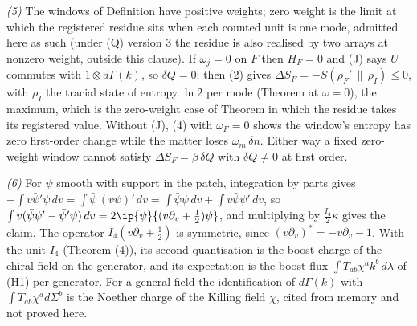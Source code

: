 \emph{(5)} The windows of Definition  have positive weights; zero weight is the limit at which the registered residue sits when each counted unit is one mode, admitted here as such (under (Q) version 3 the residue is also realised by two arrays at nonzero weight, outside this clause). If $\omega_{j} = 0$ on $F$ then $H_{F} = 0$ and (J) says $U$ commutes with $1\otimes d\Gamma(k)$, so $\delta Q = 0$; then (2) gives $\Delta S_{F} = -S(\rho_{F}'\,\|\,\rho_{I}) \le 0$, with $\rho_{I}$ the tracial state of entropy $\ln 2$ per mode (Theorem  at $\omega = 0$), the maximum, which is the zero-weight case of Theorem  in which the residue takes its registered value. Without (J), (4) with $\omega_{F} = 0$ shows the window's entropy has zero first-order change while the matter loses $\omega_{m}\,\delta n$. Either way a fixed zero-weight window cannot satisfy $\Delta S_{F} = \beta\,\delta Q$ with $\delta Q \ne 0$ at first order.

\emph{(6)} For $\psi$ smooth with support in the patch, integration by parts gives $-\int v\bar\psi'\psi\,dv = \int\bar\psi\,(v\psi)'\,dv = \int\bar\psi\psi\,dv + \int v\bar\psi\psi'\,dv$, so $\int v(\bar\psi\psi' - \bar\psi'\psi)\,dv = 2\ip{\psi}{(v\partial_{v} + \tfrac12)\psi}$, and multiplying by $\tfrac{I_{4}}{2}\kappa$ gives the claim. The operator $I_{4}(v\partial_{v} + \tfrac12)$ is symmetric, since $(v\partial_{v})^{*} = -v\partial_{v} - 1$. With the unit $I_{4}$ (Theorem (4)), its second quantisation is the boost charge of the chiral field on the generator, and its expectation is the boost flux $\int T_{ab}\chi^{a}k^{b}\,d\lambda$ of (H1) per generator. For a general field the identification of $d\Gamma(k)$ with $\int T_{ab}\chi^{a}d\Sigma^{b}$ is the Noether charge of the Killing field $\chi$, cited from memory and not proved here.

